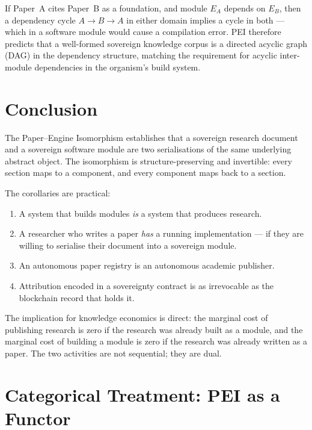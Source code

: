 \documentclass[12pt]{article}
\begin{document}
If Paper~A cites Paper~B as a foundation, and module $E_A$ depends on $E_B$,
then a dependency cycle $A \to B \to A$ in either domain implies a cycle in
both — which in a software module would cause a compilation error.  PEI
therefore predicts that a well-formed sovereign knowledge corpus is a
directed acyclic graph (DAG) in the dependency structure, matching the
requirement for acyclic inter-module dependencies in the organism's build
system.

\section{Conclusion}
\label{sec:conclusion}

The Paper--Engine Isomorphism establishes that a sovereign research document
and a sovereign software module are two serialisations of the same underlying
abstract object.  The isomorphism is structure-preserving and invertible: every
section maps to a component, and every component maps back to a section.

The corollaries are practical:
\begin{enumerate}[label=(\arabic*)]
  \item A system that builds modules \emph{is} a system that produces research.
  \item A researcher who writes a paper \emph{has} a running implementation —
    if they are willing to serialise their document into a sovereign module.
  \item An autonomous paper registry is an autonomous academic publisher.
  \item Attribution encoded in a sovereignty contract is as irrevocable as the
    blockchain record that holds it.
\end{enumerate}

The implication for knowledge economics is direct: the marginal cost of
publishing research is zero if the research was already built as a module,
and the marginal cost of building a module is zero if the research was already
written as a paper.  The two activities are not sequential; they are dual.

\section{Categorical Treatment: PEI as a Functor}
\label{sec:category}
\end{document}
